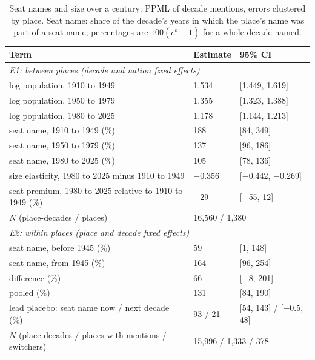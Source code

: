 \documentclass[11pt,a4paper]{article}
\begin{document}
\begin{table}[tbp]\centering\footnotesize\caption{Seat names and size over a century: PPML of decade mentions, errors clustered by place. Seat name: share of the decade's years in which the place's name was part of a seat name; percentages are $100(e^b-1)$ for a whole decade named.}\label{tab:seat}\begin{tabular}{p{8.4cm}ll}\toprule Term & Estimate & 95\% CI\\\midrule
\multicolumn{3}{l}{\textit{E1: between places (decade and nation fixed effects)}}\\
\quad log population, 1910 to 1949 & 1.534 & [1.449, 1.619]\\
\quad log population, 1950 to 1979 & 1.355 & [1.323, 1.388]\\
\quad log population, 1980 to 2025 & 1.178 & [1.144, 1.213]\\
\quad seat name, 1910 to 1949 (\%) & 188 & [84, 349]\\
\quad seat name, 1950 to 1979 (\%) & 137 & [96, 186]\\
\quad seat name, 1980 to 2025 (\%) & 105 & [78, 136]\\
\quad size elasticity, 1980 to 2025 minus 1910 to 1949 & $-$0.356 & [$-$0.442, $-$0.269]\\
\quad seat premium, 1980 to 2025 relative to 1910 to 1949 (\%) & $-$29 & [$-$55, 12]\\
\quad $N$ (place-decades / places) & \multicolumn{2}{l}{16,560 / 1,380}\\
\midrule\multicolumn{3}{l}{\textit{E2: within places (place and decade fixed effects)}}\\
\quad seat name, before 1945 (\%) & 59 & [1, 148]\\
\quad seat name, from 1945 (\%) & 164 & [96, 254]\\
\quad difference (\%) & 66 & [$-$8, 201]\\
\quad pooled (\%) & 131 & [84, 190]\\
\quad lead placebo: seat name now / next decade (\%) & 93 / 21 & [54, 143] / [$-$0.5, 48]\\
\quad $N$ (place-decades / places with mentions / switchers) & \multicolumn{2}{l}{15,996 / 1,333 / 378}\\
\bottomrule\end{tabular}\end{table}
\end{document}
